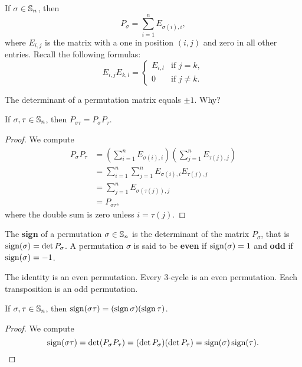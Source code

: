 If $\sigma\in\mathbb{S}_n$, then
\[
P_\sigma=\sum_{i=1}^n E_{\sigma(i),i},
\]
where $E_{i,j}$ is the matrix with a one in position
$(i,j)$ and zero in all other entries. Recall the
following formulas: 
\begin{equation}
\label{eq:E}
E_{i,j}E_{k,l}=\begin{cases}
E_{i,l} & \text{if $j=k$},\\
0 & \text{if $j\ne k$}.
\end{cases}
\end{equation}

The determinant of a permutation matrix equals 
$\pm1$. Why? 

\begin{proposition}
If $\sigma,\tau\in\mathbb{S}_n$, then $P_{\sigma\tau}=P_\sigma P_\tau$.
\end{proposition}

\begin{proof}
We compute 
\begin{align*}
P_\sigma P_\tau &=\left(\sum_{i=1}^n E_{\sigma(i),i}\right)\left(\sum_{j=1}^nE_{\tau{(j)},j}\right)\\
&=\sum_{i=1}^n\sum_{j=1}^n E_{\sigma(i),i}E_{\tau(j),j}\\
&=\sum_{j=1}^n E_{\sigma(\tau(j)),j}\\
&=P_{\sigma\tau},
\end{align*}
where the double sum is zero unless $i=\tau(j)$.
\end{proof}


\begin{definition}
    The \textbf{sign} of a permutation $\sigma\in\mathbb{S}_n$ 
    is the 
    determinant of the matrix 
    $P_\sigma$, that is $\operatorname{sign}(\sigma)=\det P_\sigma$.
    A permutation $\sigma$ is said to be \textbf{even} if $\operatorname{sign}(\sigma)=1$ and \textbf{odd} if $\operatorname{sign}(\sigma)=-1$.
\end{definition}

The identity is an even permutation. Every 3-cycle is
an even permutation. Each transposition is an odd permutation. 

\begin{proposition}
If $\sigma,\tau\in\mathbb{S}_n$, then $\operatorname{sign}(\sigma\tau)=(\operatorname{sign}\sigma)(\operatorname{sign}\tau)$.
\end{proposition}

\begin{proof}
        We compute 
        \[
        \operatorname{sign}(\sigma\tau)=\det(P_\sigma P_\tau)=(\det P_\sigma)(\det P_\tau)=\operatorname{sign}(\sigma)\operatorname{sign}(\tau).\qedhere
        \]
\end{proof}

